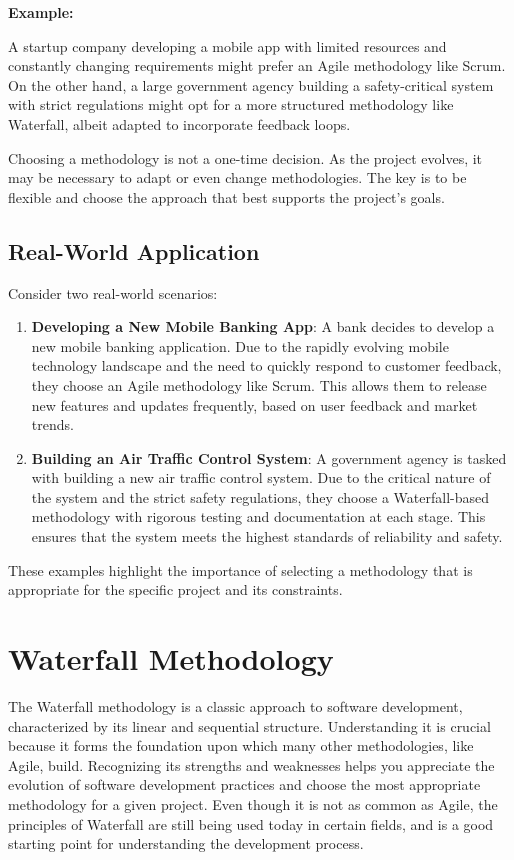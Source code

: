 \textbf{Example:}

A startup company developing a mobile app with limited resources and constantly
changing requirements might prefer an Agile methodology like Scrum. On the
other hand, a large government agency building a safety-critical system with
strict regulations might opt for a more structured methodology like Waterfall,
albeit adapted to incorporate feedback loops.

Choosing a methodology is not a one-time decision. As the project evolves, it
may be necessary to adapt or even change methodologies. The key is to be
flexible and choose the approach that best supports the project's goals.

\subsection{Real-World Application}

Consider two real-world scenarios:

\begin{enumerate}
  \item \textbf{Developing a New Mobile Banking App}: A bank decides to develop a new mobile banking application. Due to the rapidly evolving mobile technology landscape and the need to quickly respond to customer feedback, they choose an Agile methodology like Scrum. This allows them to release new features and updates frequently, based on user feedback and market trends.
  \item \textbf{Building an Air Traffic Control System}: A government agency is tasked with building a new air traffic control system. Due to the critical nature of the system and the strict safety regulations, they choose a Waterfall-based methodology with rigorous testing and documentation at each stage. This ensures that the system meets the highest standards of reliability and safety.
\end{enumerate}

These examples highlight the importance of selecting a methodology that is
appropriate for the specific project and its constraints.

\section{Waterfall Methodology}

The Waterfall methodology is a classic approach to software development,
characterized by its linear and sequential structure. Understanding it is
crucial because it forms the foundation upon which many other methodologies,
like Agile, build. Recognizing its strengths and weaknesses helps you
appreciate the evolution of software development practices and choose the most
appropriate methodology for a given project. Even though it is not as common as
Agile, the principles of Waterfall are still being used today in certain
fields, and is a good starting point for understanding the development process.

